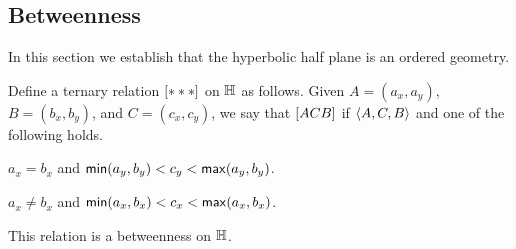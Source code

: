 \subsection*{Betweenness}

In this section we establish that the hyperbolic half plane is an ordered geometry.

\begin{prop}
Define a ternary relation \([ \ast \ast \ast ]\) on \(\mathbb{H}\) as follows.
Given \(A = (a_x, a_y)\), \(B = (b_x, b_y)\), and \(C = (c_x, c_y)\), we say that \([ A C B ]\) if \(\langle A, C, B \rangle\) and one of the following holds.
\begin{proplist}
\item \(a_x = b_x\) and \(\mathsf{min}(a_y,b_y) < c_y < \mathsf{max}(a_y,b_y)\).
\item \(a_x \neq b_x\) and \(\mathsf{min}(a_x,b_x) < c_x < \mathsf{max}(a_x,b_x)\).
\end{proplist}
This relation is a betweenness on \(\mathbb{H}\).
\end{prop}

